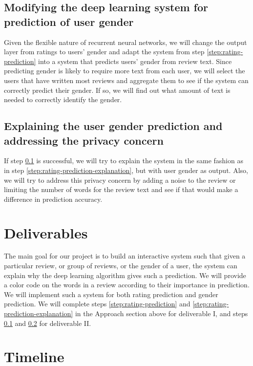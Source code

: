 \documentclass[11pt]{article}
\begin{document}
\subsection{Modifying the deep learning system for prediction of user gender}
\label{step:gender-prediction}

Given the flexible nature of recurrent neural networks, we will change the output layer from ratings to users' gender and adapt the system from step \ref{step:rating-prediction} into a system that predicts users' gender from review text. Since predicting gender is likely to require more text from each user, we will select the users that have written most reviews and aggregate them to see if the system can correctly predict their gender. If so, we will find out what amount of text is needed to correctly identify the gender.

\subsection{Explaining the user gender prediction and addressing the privacy concern}
\label{step:gender-prediction-explanation}

If step \ref{step:gender-prediction} is successful, we will try to explain the system in the same fashion as in step \ref{step:rating-prediction-explanation}, but with user gender as output. Also, we will try to address this privacy concern by adding a noise to the review or limiting the number of words for the review text and see if that would make a difference in prediction accuracy. 

\section{Deliverables}

The main goal for our project is to build an interactive system such that given a particular review, or group of reviews, or the gender of a user, the system can explain why the deep learning algorithm gives such a prediction. We will provide a color code on the words in a review according to their importance in prediction. We will implement such a system for both rating prediction and gender prediction. We will complete steps \ref{step:rating-prediction} and \ref{step:rating-prediction-explanation} in the Approach section above for deliverable I, and steps \ref{step:gender-prediction} and \ref{step:gender-prediction-explanation} for deliverable II. 

\section{Timeline}
\end{document}

